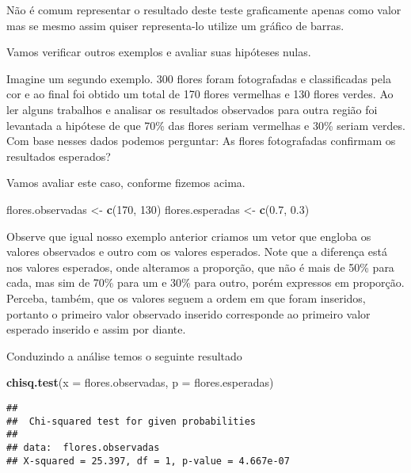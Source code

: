 \documentclass[]{book}
\newenvironment{Shaded}{\begin{snugshade}}{\end{snugshade}}
\newcommand{\DataTypeTok}[1]{\textcolor[rgb]{0.13,0.29,0.53}{#1}}
\newcommand{\DecValTok}[1]{\textcolor[rgb]{0.00,0.00,0.81}{#1}}
\newcommand{\FloatTok}[1]{\textcolor[rgb]{0.00,0.00,0.81}{#1}}
\newcommand{\KeywordTok}[1]{\textcolor[rgb]{0.13,0.29,0.53}{\textbf{#1}}}
\newcommand{\NormalTok}[1]{#1}
\newcommand{\StringTok}[1]{\textcolor[rgb]{0.31,0.60,0.02}{#1}}
\begin{document}
Não é comum representar o resultado deste teste graficamente apenas como valor mas se mesmo assim quiser representa-lo utilize um gráfico de barras.

Vamos verificar outros exemplos e avaliar suas hipóteses nulas.

Imagine um segundo exemplo. 300 flores foram fotografadas e classificadas pela cor e ao final foi obtido um total de 170 flores vermelhas e 130 flores verdes. Ao ler alguns trabalhos e analisar os resultados observados para outra região foi levantada a hipótese de que 70\% das flores seriam vermelhas e 30\% seriam verdes. Com base nesses dados podemos perguntar: As flores fotografadas confirmam os resultados esperados?

Vamos avaliar este caso, conforme fizemos acima.

\begin{Shaded}
\begin{Highlighting}[]
\NormalTok{flores.observadas <-}\StringTok{ }\KeywordTok{c}\NormalTok{(}\DecValTok{170}\NormalTok{, }\DecValTok{130}\NormalTok{)}
\NormalTok{flores.esperadas <-}\StringTok{ }\KeywordTok{c}\NormalTok{(}\FloatTok{0.7}\NormalTok{, }\FloatTok{0.3}\NormalTok{)}
\end{Highlighting}
\end{Shaded}

Observe que igual nosso exemplo anterior criamos um vetor que engloba os valores observados e outro com os valores esperados. Note que a diferença está nos valores esperados, onde alteramos a proporção, que não é mais de 50\% para cada, mas sim de 70\% para um e 30\% para outro, porém expressos em proporção. Perceba, também, que os valores seguem a ordem em que foram inseridos, portanto o primeiro valor observado inserido corresponde ao primeiro valor esperado inserido e assim por diante.

Conduzindo a análise temos o seguinte resultado

\begin{Shaded}
\begin{Highlighting}[]
\KeywordTok{chisq.test}\NormalTok{(}\DataTypeTok{x =}\NormalTok{ flores.observadas, }\DataTypeTok{p =}\NormalTok{ flores.esperadas)}
\end{Highlighting}
\end{Shaded}

\begin{verbatim}
## 
##  Chi-squared test for given probabilities
## 
## data:  flores.observadas
## X-squared = 25.397, df = 1, p-value = 4.667e-07
\end{verbatim}
\end{document}
